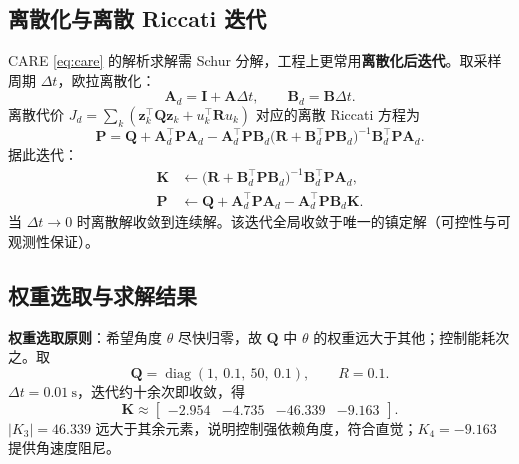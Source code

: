 \documentclass[11pt,a4paper]{article}
\begin{document}
\subsection{离散化与离散 Riccati 迭代}

CARE \eqref{eq:care} 的解析求解需 Schur 分解，工程上更常用\textbf{离散化后迭代}。取采样周期 $\Delta t$，欧拉离散化：
\begin{equation}
    \mathbf A_d = \mathbf I + \mathbf A\Delta t, \qquad \mathbf B_d = \mathbf B\Delta t .
\end{equation}
离散代价 $J_d = \sum_k (\mathbf z_k^{\top}\mathbf Q\mathbf z_k + u_k^{\top}\mathbf R u_k)$ 对应的离散 Riccati 方程为
\begin{equation}
    \mathbf P = \mathbf Q + \mathbf A_d^{\top}\mathbf P\mathbf A_d
    - \mathbf A_d^{\top}\mathbf P\mathbf B_d\big(\mathbf R + \mathbf B_d^{\top}\mathbf P\mathbf B_d\big)^{-1}\mathbf B_d^{\top}\mathbf P\mathbf A_d .
\end{equation}
据此迭代：
\begin{align}
    \mathbf K &\leftarrow \big(\mathbf R + \mathbf B_d^{\top}\mathbf P\mathbf B_d\big)^{-1} \mathbf B_d^{\top}\mathbf P \mathbf A_d, \label{eq:dlqr_k}\\
    \mathbf P &\leftarrow \mathbf Q + \mathbf A_d^{\top}\mathbf P\mathbf A_d - \mathbf A_d^{\top}\mathbf P\mathbf B_d \mathbf K . \label{eq:dlqr_p}
\end{align}
当 $\Delta t \to 0$ 时离散解收敛到连续解。该迭代全局收敛于唯一的镇定解（可控性与可观测性保证）。

\subsection{权重选取与求解结果}

\textbf{权重选取原则}：希望角度 $\theta$ 尽快归零，故 $\mathbf Q$ 中 $\theta$ 的权重远大于其他；控制能耗次之。取
\begin{equation}
    \mathbf Q = \operatorname{diag}(1,\ 0.1,\ 50,\ 0.1), \qquad R = 0.1 .
\end{equation}
$\Delta t = 0.01\ \mathrm{s}$，迭代约十余次即收敛，得
\begin{equation}
    \mathbf K \approx \begin{bmatrix} -2.954 & -4.735 & -46.339 & -9.163 \end{bmatrix} .
\end{equation}
$|K_3| = 46.339$ 远大于其余元素，说明控制强依赖角度，符合直觉；$K_4 = -9.163$ 提供角速度阻尼。
\end{document}
